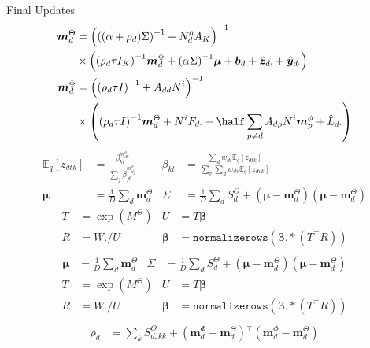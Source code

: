 \documentclass[xcolor=dvipsnames]{beamer}
\newcommand \vv[1]   { { \boldsymbol{#1} } }
\newcommand \T       { { ^\top } }
\newcommand \ex[2]   { { \mathbb{E}_{{#1}}\left[ #2 \right] } }
\newcommand \mtd { { \boldsymbol{m}_d^{\Theta} } }
\newcommand \std { { S_d^{\Theta}              } }
\newcommand \mpd { { \boldsymbol{m}_d^{\Phi}   } }
\newcommand \invb[1]  { { \left( #1 \right)^{-1}     } }
\begin{document}
\begin{frame}{Final Updates}
\small
\begin{align*}
\mtd &= \invb{ \invb{(\alpha + \rho_d)\Sigma} + N^o_d A_K } \\
    & \times
            \left(
                \invb{\rho_d \tau I_K} \mpd
                + \invb{\alpha \Sigma}\vv{\mu}
                + \vv{b}_d 
                + \hat{\vv{z}}_{d\cdot}
                + \hat{\vv{y}}_{d\cdot}
            \right) \\
 \mpd & = \invb{\invb{\rho_d \tau I} + A_{dd}N^i} \\
  & \times
             \left(
                 \invb{\rho_d \tau I}\mtd + N^i F_{d\cdot} -\half \sum_{p \neq d} A_{dp} N^i \vv{m}^\phi_p + \hat{L}_{d\cdot}
             \right)
\end{align*}
 {
     \begin{align*}
     \ex{q}{z_{dtk}}    & = \frac{\beta_{kt}^{m^\theta_{dk}}}{\sum_j \beta_{jt}^{m^\theta_{dj}}} &
     \beta_{kt} & = \frac{\sum_d w_{dt}\ex{q}{z_{dtk}}}{\sum_v \sum_d w_{dv}\ex{q}{z_{dvk}}} \\
     \vv{\mu} & = \frac{1}{D}\sum_d \mtd &
     \Sigma   & = \frac{1}{D}\sum_d \std + (\vv{\mu} - \mtd)(\vv{\mu} - \mtd)
     \end{align*}
}
 {
    \begin{align*}
    T & = \exp(M^{\Theta}) &
    U & = T \vv{\beta} \\
    R & = W ./ U &
    \vv{\beta} & = \texttt{normalizerows}(\vv{\beta} .* (T\T R))\\
    \end{align*}
    \begin{align*}
    \vv{\mu} & = \frac{1}{D}\sum_d \mtd &
    \Sigma   & = \frac{1}{D}\sum_d \std + (\vv{\mu} - \mtd)(\vv{\mu} - \mtd)
    \end{align*}
}
 {
    \begin{align*}
    T & = \exp(M^{\Theta}) &
    U & = T \vv{\beta} \\
    R & = W ./ U &
    \vv{\beta} & = \texttt{normalizerows}(\vv{\beta} .* (T\T R))\\
    \end{align*}
    \begin{align*}
    \rho_d   & = \sum_k S^{\Theta}_{d,kk} + (\mpd - \mtd)\T(\mpd - \mtd)
    \end{align*}
}



    
\normalsize

\end{frame}
\end{document}

